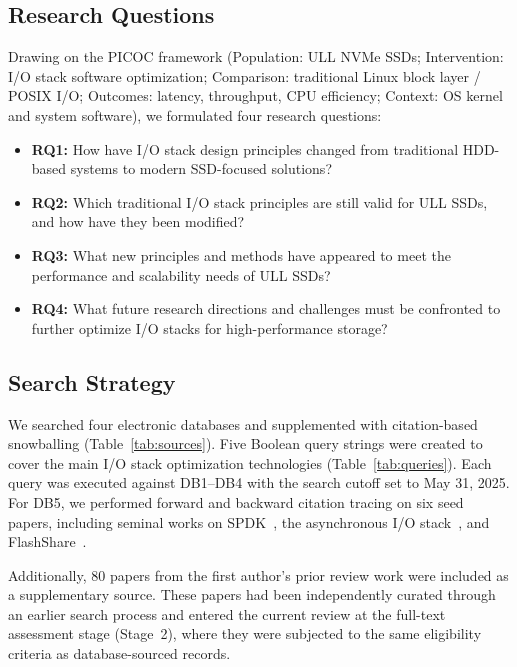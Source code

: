 \documentclass[conference]{IEEEtran}
\begin{document}
\subsection{Research Questions}

Drawing on the PICOC framework (Population: ULL NVMe SSDs; Intervention: I/O stack software optimization; Comparison: traditional Linux block layer / POSIX I/O; Outcomes: latency, throughput, CPU efficiency; Context: OS kernel and system software), we formulated four research questions:

\begin{itemize}
\item \textbf{RQ1:} How have I/O stack design principles changed from traditional HDD-based systems to modern SSD-focused solutions?
\item \textbf{RQ2:} Which traditional I/O stack principles are still valid for ULL SSDs, and how have they been modified?
\item \textbf{RQ3:} What new principles and methods have appeared to meet the performance and scalability needs of ULL SSDs?
\item \textbf{RQ4:} What future research directions and challenges must be confronted to further optimize I/O stacks for high-performance storage?
\end{itemize}

\subsection{Search Strategy}

We searched four electronic databases and supplemented with citation-based snowballing (Table~\ref{tab:sources}). Five Boolean query strings were created to cover the main I/O stack optimization technologies (Table~\ref{tab:queries}). Each query was executed against DB1--DB4 with the search cutoff set to May 31, 2025. For DB5, we performed forward and backward citation tracing on six seed papers, including seminal works on SPDK~\cite{yang2017spdk}, the asynchronous I/O stack~\cite{lee2019asynchronous}, and FlashShare~\cite{zhang2018flashshare}.

Additionally, 80 papers from the first author's prior review work were included as a supplementary source. These papers had been independently curated through an earlier search process and entered the current review at the full-text assessment stage (Stage~2), where they were subjected to the same eligibility criteria as database-sourced records.
\end{document}
